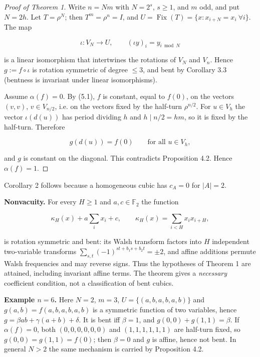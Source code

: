 \documentclass[11pt,reqno]{amsart}
\begin{document}
\begin{proof}[Proof of Theorem 1]
Write $n=Nm$ with $N=2^s$, $s\ge1$, and $m$ odd, and put $N=2h$. Let $T=\rho^N$; then $T^m=\rho^n=I$, and $U=\operatorname{Fix}(T)=\{x:x_{i+N}=x_i\ \forall i\}$. The map

\begin{equation*}\iota:V_N\to U,\qquad(\iota y)_i=y_{i\bmod N}\end{equation*}

is a linear isomorphism that intertwines the rotations of $V_N$ and $V_n$. Hence $g:=f\circ\iota$ is rotation symmetric of degree $\le3$, and bent by Corollary 3.3 (bentness is invariant under linear isomorphisms).

Assume $\alpha(f)=0$. By (5.1), $f$ is constant, equal to $f(0)$, on the vectors $(v,v)$, $v\in V_{n/2}$, i.e. on the vectors fixed by the half-turn $\rho^{n/2}$. For $u\in V_h$ the vector $\iota(d(u))$ has period dividing $h$ and $h\mid n/2=hm$, so it is fixed by the half-turn. Therefore

\begin{equation*}g(d(u))=f(0)\qquad\text{for all }u\in V_h,\end{equation*}

and $g$ is constant on the diagonal. This contradicts Proposition 4.2. Hence $\alpha(f)=1$.
\end{proof}

Corollary 2 follows because a homogeneous cubic has $c_A=0$ for $|A|=2$.

\textbf{Nonvacuity.} For every $H\ge1$ and $a,c\in\mathbb F_2$ the function

\begin{equation*}\kappa_H(x)+a\sum_ix_i+c,\qquad\kappa_H(x)=\sum_{i<H}x_ix_{i+H},\end{equation*}

is rotation symmetric and bent: its Walsh transform factors into $H$ independent two-variable transforms $\sum_{s,t}(-1)^{st+b_1s+b_2t}=\pm2$, and affine additions permute Walsh frequencies and may reverse signs. Thus the hypotheses of Theorem 1 are attained, including invariant affine terms. The theorem gives a \emph{necessary} coefficient condition, not a classification of bent cubics.

\textbf{Example $n=6$.} Here $N=2$, $m=3$, $U=\{(a,b,a,b,a,b)\}$ and $g(a,b)=f(a,b,a,b,a,b)$ is a symmetric function of two variables, hence $g=\beta ab+\gamma(a+b)+\delta$. It is bent iff $\beta=1$, and $g(0,0)+g(1,1)=\beta$. If $\alpha(f)=0$, both $(0,0,0,0,0,0)$ and $(1,1,1,1,1,1)$ are half-turn fixed, so $g(0,0)=g(1,1)=f(0)$; then $\beta=0$ and $g$ is affine, hence not bent. In general $N>2$ the same mechanism is carried by Proposition 4.2.
\end{document}
